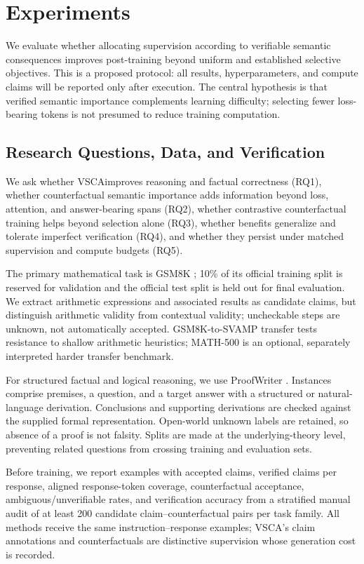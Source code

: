 \documentclass{article}
\newcommand{\vsca}{\textsc{VSCA}}
\begin{document}
\section{Experiments}
\label{sec:experiments}
We evaluate whether allocating supervision according to verifiable semantic consequences improves post-training beyond uniform and established selective objectives. This is a proposed protocol: all results, hyperparameters, and compute claims will be reported only after execution. The central hypothesis is that verified semantic importance complements learning difficulty; selecting fewer loss-bearing tokens is not presumed to reduce training computation.

\subsection{Research Questions, Data, and Verification}
\label{sec:experimental-design}
We ask whether \vsca improves reasoning and factual correctness (RQ1), whether counterfactual semantic importance adds information beyond loss, attention, and answer-bearing spans (RQ2), whether contrastive counterfactual training helps beyond selection alone (RQ3), whether benefits generalize and tolerate imperfect verification (RQ4), and whether they persist under matched supervision and compute budgets (RQ5).

The primary mathematical task is GSM8K \citep{gsm8k}; 10\% of its official training split is reserved for validation and the official test split is held out for final evaluation. We extract arithmetic expressions and associated results as candidate claims, but distinguish arithmetic validity from contextual validity; uncheckable steps are unknown, not automatically accepted. GSM8K-to-SVAMP transfer \citep{svamp} tests resistance to shallow arithmetic heuristics; MATH-500 is an optional, separately interpreted harder transfer benchmark.

For structured factual and logical reasoning, we use ProofWriter \citep{proofwriter}. Instances comprise premises, a question, and a target answer with a structured or natural-language derivation. Conclusions and supporting derivations are checked against the supplied formal representation. Open-world unknown labels are retained, so absence of a proof is not falsity. Splits are made at the underlying-theory level, preventing related questions from crossing training and evaluation sets.

Before training, we report examples with accepted claims, verified claims per response, aligned response-token coverage, counterfactual acceptance, ambiguous/unverifiable rates, and verification accuracy from a stratified manual audit of at least 200 candidate claim--counterfactual pairs per task family. All methods receive the same instruction--response examples; \vsca's claim annotations and counterfactuals are distinctive supervision whose generation cost is recorded.
\end{document}
